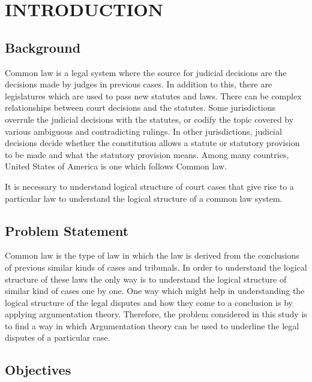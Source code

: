 \setlength{\footskip}{8mm}

\chapter{INTRODUCTION}

\section{Background}

Common law is a legal system where the source for judicial decisions are the decisions made by judges in previous cases.
In addition to this, there are legislatures which are used to pass new statutes and laws.
There can be complex relationships between court decisions and the statutes. Some jurisdictions overrule the judicial decisions with the statutes, or codify the topic covered by various ambiguous and contradicting rulings.
In other jurisdictions, judicial decisions decide whether the constitution allows a statute or statutory provision to be made and what the statutory provision means.
Among many countries, United States of America is one which follows Common law.

It is necessary to understand logical structure of court cases that give rise to a particular law to understand the logical structure of a common law system.

\section{Problem Statement}

Common law is the type of law in which the law is derived from the conclusions of previous similar
kinds of cases and tribunals. In order to understand the logical structure of these laws the only way
is to understand the logical structure of similar kind of cases one by one. One way which might
help in understanding the logical structure of the legal disputes and how they come to a conclusion
is by applying argumentation theory. Therefore, the problem considered in this study is to find a
way in which Argumentation theory can be used to underline the legal disputes of a
particular case.

\section{Objectives}


